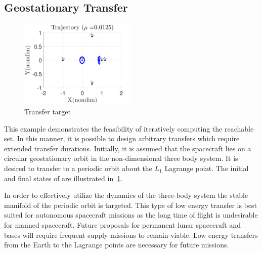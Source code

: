 \documentclass[preprint]{elsarticle}
\begin{document}
\subsection{Geostationary Transfer}
\begin{figure}[htbp]
   \centering
   \includegraphics[width=0.5\textwidth]{initial_final} %
   \caption{Transfer target}
   \label{fig:geo_transfer_target}
\end{figure}

This example demonstrates the feasibility of iteratively computing the reachable set. 
In this manner, it is possible to design arbitrary transfers which require extended transfer durations.
Initially, it is assumed that the spacecraft lies on a circular geostationary orbit in the non-dimensional three body system. 
It is desired to transfer to a periodic orbit about the \( L_1 \) Lagrange point. 
The initial and final states of are illustrated in~\cref{fig:geo_transfer_target}.

In order to effectively utilize the dynamics of the three-body system the stable manifold of the periodic orbit is targeted.
This type of low energy transfer is best suited for autonomous spacecraft missions as the long time of flight is undesirable for manned spacecraft. 
Future proposals for permanent lunar spacecraft and bases will require frequent supply missions to remain viable. 
Low energy transfers from the Earth to the Lagrange points are necessary for future missions.
\end{document}
